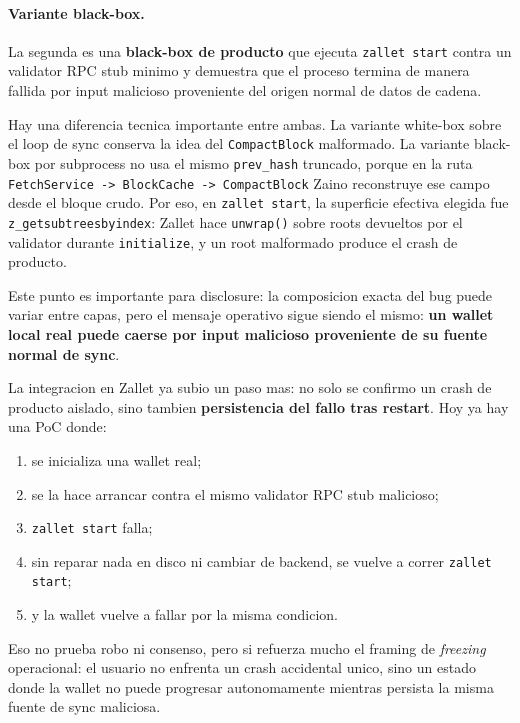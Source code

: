 \documentclass[11pt,a4paper]{article}
\begin{document}
\paragraph{Variante black-box.}
La segunda es una \textbf{black-box de producto} que ejecuta
\texttt{zallet start} contra un validator RPC stub minimo y demuestra que el
proceso termina de manera fallida por input malicioso proveniente del origen
normal de datos de cadena.

Hay una diferencia tecnica importante entre ambas. La variante white-box sobre
el loop de sync conserva la idea del \texttt{CompactBlock} malformado. La
variante black-box por subprocess no usa el mismo \texttt{prev\_hash}
truncado, porque en la ruta
\texttt{FetchService -> BlockCache -> CompactBlock} Zaino reconstruye ese
campo desde el bloque crudo. Por eso, en \texttt{zallet start}, la superficie
efectiva elegida fue \texttt{z\_getsubtreesbyindex}: Zallet hace
\texttt{unwrap()} sobre roots devueltos por el validator durante
\texttt{initialize}, y un root malformado produce el crash de producto.

Este punto es importante para disclosure: la composicion exacta del bug puede
variar entre capas, pero el mensaje operativo sigue siendo el mismo:
\textbf{un wallet local real puede caerse por input malicioso proveniente de su
fuente normal de sync}.

La integracion en Zallet ya subio un paso mas: no solo se confirmo un crash de
producto aislado, sino tambien \textbf{persistencia del fallo tras restart}.
Hoy ya hay una PoC donde:

\begin{enumerate}[leftmargin=2em]
    \item se inicializa una wallet real;
    \item se la hace arrancar contra el mismo validator RPC stub malicioso;
    \item \texttt{zallet start} falla;
    \item sin reparar nada en disco ni cambiar de backend, se vuelve a correr
    \texttt{zallet start};
    \item y la wallet vuelve a fallar por la misma condicion.
\end{enumerate}

Eso no prueba robo ni consenso, pero si refuerza mucho el framing de
\textit{freezing} operacional: el usuario no enfrenta un crash accidental
unico, sino un estado donde la wallet no puede progresar autonomamente mientras
persista la misma fuente de sync maliciosa.
\end{document}
